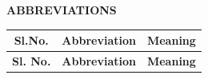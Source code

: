 \clearpage  
\fancyfoot[R]{}
\begin{center}
	{\Large\bfseries ABBREVIATIONS}
\end{center}

\vspace{0.5cm}

\renewcommand{\arraystretch}{1.25}

\setcounter{rowcount}{0}

\begin{longtable}{|c|c|p{12cm}|}
	\hline
	\textbf{Sl.No.} & \textbf{Abbreviation} & \centering\textbf{Meaning}\arraybackslash \\ \hline
	\endfirsthead
	
	\hline
	\textbf{Sl. No.} & \textbf{Abbreviation} & \centering\textbf{Meaning}\arraybackslash \\ \hline
	\endhead
	

\end{longtable}

